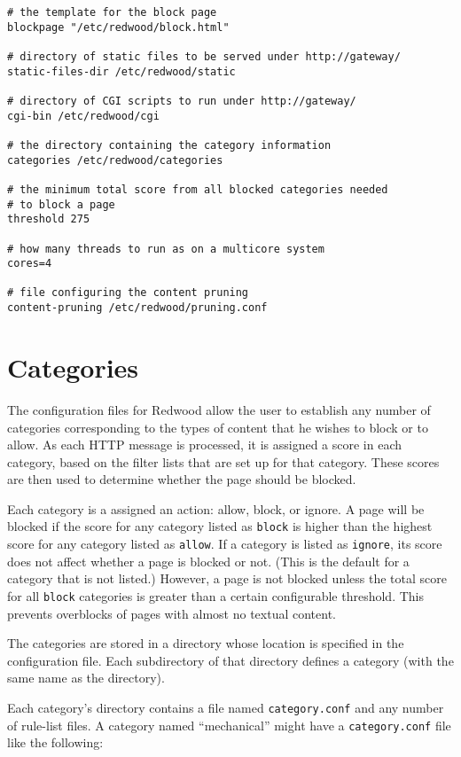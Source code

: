 \documentclass{article}
\begin{document}
\begin{verbatim}
# the template for the block page
blockpage "/etc/redwood/block.html"

# directory of static files to be served under http://gateway/
static-files-dir /etc/redwood/static

# directory of CGI scripts to run under http://gateway/
cgi-bin /etc/redwood/cgi

# the directory containing the category information
categories /etc/redwood/categories

# the minimum total score from all blocked categories needed 
# to block a page
threshold 275

# how many threads to run as on a multicore system
cores=4

# file configuring the content pruning
content-pruning /etc/redwood/pruning.conf
\end{verbatim}

\section{Categories}

The configuration files for Redwood allow the user to establish any number of categories 
corresponding to the types of content that he wishes to block or to allow. 
As each HTTP message is processed, it is assigned a score in each category, 
based on the filter lists that are set up for that category. 
These scores are then used to determine whether the page should be blocked.

Each category is a assigned an action: allow, block, or ignore. 
A page will be blocked if the score for any category listed as \verb"block" 
is higher than the highest score for any category listed as \verb"allow". 
If a category is listed as \verb"ignore", its score does not affect whether a page 
is blocked or not. (This is the default for a category that is not listed.) 
However, a page is not blocked unless the total score for all \verb"block" categories 
is greater than a certain configurable threshold. This prevents overblocks 
of pages with almost no textual content.

The categories are stored in a directory whose location is specified in the configuration file. 
Each subdirectory of that directory defines a category (with the same name as the directory). 

Each category's directory contains a file named \verb"category.conf" and any number of rule-list files. 
A category named ``mechanical'' might have a \verb"category.conf" file like the following:
\end{document}
